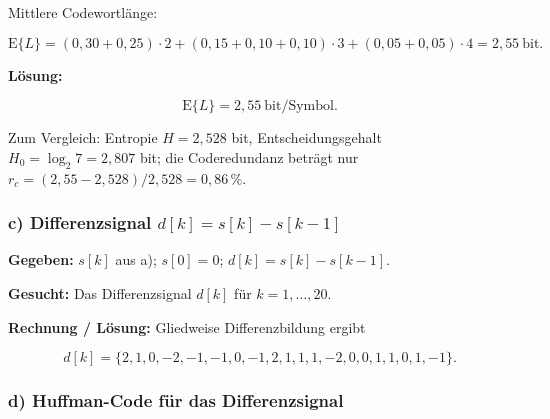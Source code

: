 \begin{beispiel}
Mittlere Codewortlänge:

$$
\mathrm{E}\{L\} = (0{,}30 + 0{,}25)\cdot 2 + (0{,}15 + 0{,}10 + 0{,}10)\cdot 3
+ (0{,}05 + 0{,}05)\cdot 4 = 2{,}55\ \text{bit}.
$$

\textbf{Lösung:}

$$
\boxed{\;\mathrm{E}\{L\} = 2{,}55\ \text{bit/Symbol}.\;}
$$

Zum Vergleich: Entropie $H = 2{,}528$ bit, Entscheidungsgehalt
$H_0 = \log_2 7 = 2{,}807$ bit; die Coderedundanz beträgt nur
$r_c = (2{,}55 - 2{,}528)/2{,}528 = 0{,}86\,\%$.

\end{beispiel}

\subsubsection*{c) Differenzsignal $d[k] = s[k] - s[k-1]$}

\begin{beispiel}

\textbf{Gegeben:} $s[k]$ aus a); $s[0] = 0$; $d[k] = s[k] - s[k-1]$.

\textbf{Gesucht:} Das Differenzsignal $d[k]$ für $k = 1,\dots,20$.

\textbf{Rechnung / Lösung:} Gliedweise Differenzbildung ergibt

$$
d[k] = \{2,1,0,-2,-1,-1,0,-1,2,1,1,1,-2,0,0,1,1,0,1,-1\}.
$$

\begin{center}
\end{center}

\end{beispiel}

\subsubsection*{d) Huffman-Code für das Differenzsignal}

